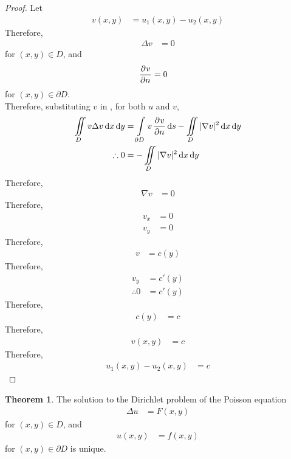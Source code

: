 \documentclass[titlepage, fleqn, a4paper, 12pt, twoside]{article}
\theoremstyle{definition}
\theoremstyle{theorem}
\newtheorem{theorem}{Theorem}
\begin{document}
\begin{proof}
	Let
	\begin{align*}
		v(x,y) & = u_1(x,y) - u_2(x,y)
	\end{align*}
	Therefore,
	\begin{align*}
		\Delta v & = 0
	\end{align*}
	for $(x,y) \in D$, and
	\begin{align*}
		\dpd{v}{n} & = 0
	\end{align*}
	for $(x,y) \in \partial D$.\\
	Therefore, substituting $v$ in , for both $u$ and $v$,
	\begin{align*}
		\iint\limits_{D} v \Delta v \dif x \dif y & = \int\limits_{\partial D} v \dpd{v}{n} \dif s - \iint\limits_{D} |\nabla v|^2 \dif x \dif y \\
		\therefore 0                              & = -\iint\limits_{D} |\nabla v|^2 \dif x \dif y
	\end{align*}
	Therefore,
	\begin{align*}
		\nabla v & = 0
	\end{align*}
	Therefore,
	\begin{align*}
		v_x & = 0 \\
		v_y & = 0
	\end{align*}
	Therefore,
	\begin{align*}
		v & = c(y)
	\end{align*}
	Therefore,
	\begin{align*}
		v_y          & = c'(y) \\
		\therefore 0 & = c'(y)
	\end{align*}
	Therefore,
	\begin{align*}
		c(y) & = c
	\end{align*}
	Therefore,
	\begin{align*}
		v(x,y) & = c
	\end{align*}
	Therefore,
	\begin{align*}
		u_1(x,y) - u_2(x,y) & = c
	\end{align*}
\end{proof}

\begin{theorem}
	The solution to the Dirichlet problem of the Poisson equation
	\begin{align*}
		\Delta u & = F(x,y)
	\end{align*}
	for $(x,y) \in D$, and
	\begin{align*}
		u(x,y) & = f(x,y)
	\end{align*}
	for $(x,y) \in \partial D$ is unique.
\end{theorem}
\end{document}
